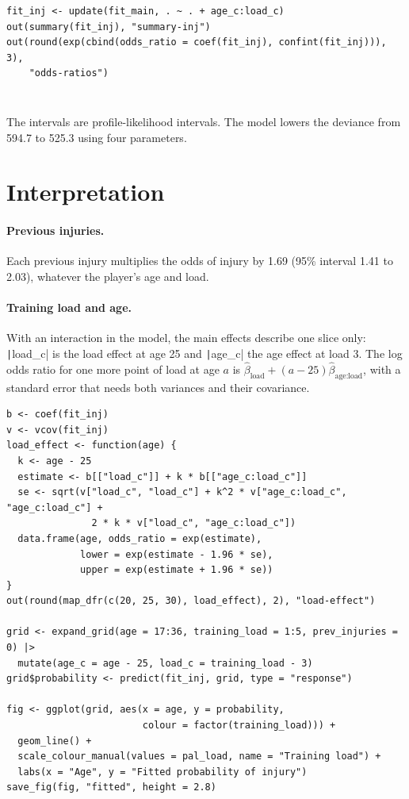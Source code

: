 \documentclass[12pt,notitlepage]{report}
\begin{document}
\begin{verbatim}
fit_inj <- update(fit_main, . ~ . + age_c:load_c)
out(summary(fit_inj), "summary-inj")
out(round(exp(cbind(odds_ratio = coef(fit_inj), confint(fit_inj))), 3),
    "odds-ratios")
\end{verbatim}

\inputminted{text}{output/summary-inj.txt}
\inputminted{text}{output/odds-ratios.txt}

The intervals are profile-likelihood intervals. The model lowers the deviance
from 594.7 to 525.3 using four parameters.

\section{Interpretation}

\paragraph{Previous injuries.}
Each previous injury multiplies the odds of injury by 1.69 (95\% interval
1.41 to 2.03), whatever the player's age and load.

\paragraph{Training load and age.}
With an interaction in the model, the main effects describe one slice only:
\texttt|load_c| is the load effect at age 25 and
\texttt|age_c| the age effect at load 3. The log odds ratio for one
more point of load at age $a$ is
$\hat\beta_{\text{load}} + (a - 25)\hat\beta_{\text{age:load}}$, with a
standard error that needs both variances and their covariance.

\begin{verbatim}
b <- coef(fit_inj)
v <- vcov(fit_inj)
load_effect <- function(age) {
  k <- age - 25
  estimate <- b[["load_c"]] + k * b[["age_c:load_c"]]
  se <- sqrt(v["load_c", "load_c"] + k^2 * v["age_c:load_c", "age_c:load_c"] +
               2 * k * v["load_c", "age_c:load_c"])
  data.frame(age, odds_ratio = exp(estimate),
             lower = exp(estimate - 1.96 * se),
             upper = exp(estimate + 1.96 * se))
}
out(round(map_dfr(c(20, 25, 30), load_effect), 2), "load-effect")

grid <- expand_grid(age = 17:36, training_load = 1:5, prev_injuries = 0) |>
  mutate(age_c = age - 25, load_c = training_load - 3)
grid$probability <- predict(fit_inj, grid, type = "response")

fig <- ggplot(grid, aes(x = age, y = probability,
                        colour = factor(training_load))) +
  geom_line() +
  scale_colour_manual(values = pal_load, name = "Training load") +
  labs(x = "Age", y = "Fitted probability of injury")
save_fig(fig, "fitted", height = 2.8)
\end{verbatim}
\end{document}
